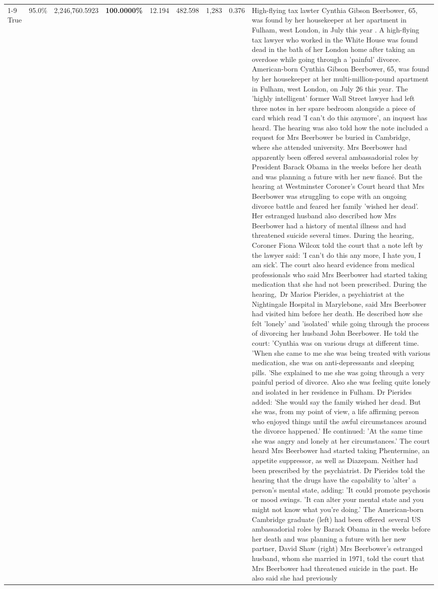 \begin{table}[H]
\begin{tabular}{lllrlllll}
\cline{1-9}
True & 95.0\% & 2,246,760.5923 & \bfseries \color{red} 100.0000\% & 12.194 & 482.598 & 1,283 & 0.376 & High-flying tax lawter Cynthia Gibson Beerbower, 65, was found by her housekeeper at her apartment in Fulham, west London, in July this year . A high-flying tax lawyer who worked in the White House was found dead in the bath of her London home after taking an overdose while going through a 'painful' divorce. American-born Cynthia Gibson Beerbower, 65, was found by her housekeeper at her multi-million-pound apartment in Fulham, west London, on July 26 this year. The 'highly intelligent' former Wall Street lawyer had left three notes in her spare bedroom alongside a piece of card which read 'I can't do this anymore', an inquest has heard. The hearing was also told how the note included a request for Mrs Beerbower be buried in Cambridge, where she attended university. Mrs Beerbower had apparently been offered several ambassadorial roles by President Barack Obama in the weeks before her death and was planning a future with her new fiancé. But the hearing at Westminster Coroner's Court heard that Mrs Beerbower was struggling to cope with an ongoing divorce battle and feared her family 'wished her dead'. Her estranged husband also described how Mrs Beerbower had a history of mental illness and had threatened suicide several times. During the hearing, Coroner Fiona Wilcox told the court that a note left by the lawyer said: 'I can't do this any more, I hate you, I am sick'. The court also heard evidence from medical professionals who said Mrs Beerbower had started taking medication that she had not been prescribed. During the hearing, Dr Marios Pierides, a psychiatrist at the Nightingale Hospital in Marylebone, said Mrs Beerbower had visited him before her death. He described how she felt 'lonely' and 'isolated' while going through the process of divorcing her husband John Beerbower. He told the court: 'Cynthia was on various drugs at different time. 'When she came to me she was being treated with various medication, she was on anti-depressants and sleeping pills. 'She explained to me she was going through a very painful period of divorce. Also she was feeling quite lonely and isolated in her residence in Fulham. Dr Pierides added: 'She would say the family wished her dead. But she was, from my point of view, a life affirming person who enjoyed things until the awful circumstances around the divorce happened.' He continued: 'At the same time she was angry and lonely at her circumstances.' The court heard Mrs Beerbower had started taking Phentermine, an appetite suppressor, as well as Diazepam. Neither had been prescribed by the psychiatrist. Dr Pierides told the hearing that the drugs have the capability to 'alter' a person's mental state, adding: 'It could promote psychosis or mood swings. 'It can alter your mental state and you might not know what you're doing.' The American-born Cambridge graduate (left) had been offered several US ambassadorial roles by Barack Obama in the weeks before her death and was planning a future with her new partner, David Shaw (right) Mrs Beerbower's estranged husband, whom she married in 1971, told the court that Mrs Beerbower had threatened suicide in the past. He also said she had previously 
\end{tabular}
\end{table}
